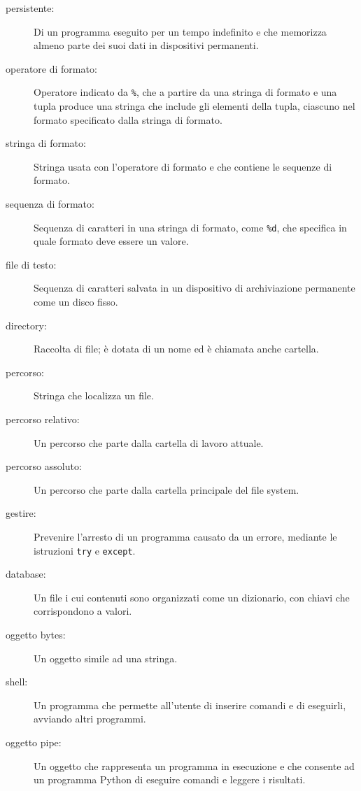 \documentclass[10pt]{book}
\begin{document}
\begin{description}

\item[persistente:] Di un programma eseguito per un tempo indefinito e che memorizza almeno parte dei suoi dati in dispositivi permanenti.

\item[operatore di formato:] Operatore indicato da {\tt \%}, che a partire da una stringa di formato e una tupla produce una stringa che include gli elementi della tupla, ciascuno nel formato specificato dalla stringa di formato.

\item[stringa di formato:] Stringa usata con l'operatore di formato e che contiene le sequenze di formato.  

\item[sequenza di formato:] Sequenza di caratteri in una stringa di formato, come {\tt \%d}, che specifica in quale formato deve essere un valore.

\item[file di testo:] Sequenza di caratteri salvata in un dispositivo di archiviazione permanente come un disco fisso.

\item[directory:] Raccolta di file; è dotata di un nome ed è chiamata anche cartella.

\item[percorso:] Stringa che localizza un file.

\item[percorso relativo:] Un percorso che parte dalla cartella di lavoro attuale.

\item[percorso assoluto:] Un percorso che parte dalla cartella principale del file system.

\item[gestire:] Prevenire l'arresto di un programma causato da un errore, mediante le istruzioni {\tt try}
e {\tt except}.

\item[database:] Un file i cui contenuti sono organizzati come un dizionario, con chiavi che corrispondono a valori.

\item[oggetto bytes:] Un oggetto simile ad una stringa.

\item[shell:] Un programma che permette all'utente di inserire comandi e di eseguirli, avviando altri programmi.

\item[oggetto pipe:] Un oggetto che rappresenta un programma in esecuzione e che consente ad un programma Python di eseguire comandi e leggere i risultati.

\end{description}
\end{document}
